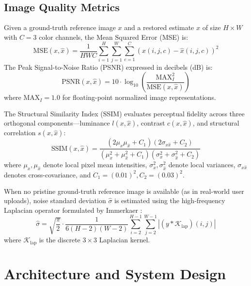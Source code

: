\documentclass{ieeeaccess}
\begin{document}
\subsection{Image Quality Metrics}
Given a ground-truth reference image $x$ and a restored estimate $\hat{x}$ of size $H \times W$ with $C=3$ color channels, the Mean Squared Error (MSE) is:
\begin{equation}
\text{MSE}(x, \hat{x}) = \frac{1}{H W C} \sum_{i=1}^H \sum_{j=1}^W \sum_{c=1}^C \left( x(i, j, c) - \hat{x}(i, j, c) \right)^2
\end{equation}
The Peak Signal-to-Noise Ratio (PSNR) expressed in decibels (dB) is:
\begin{equation}
\text{PSNR}(x, \hat{x}) = 10 \cdot \log_{10} \left( \frac{\text{MAX}_I^2}{\text{MSE}(x, \hat{x})} \right)
\end{equation}
where $\text{MAX}_I = 1.0$ for floating-point normalized image representations.

The Structural Similarity Index (SSIM) evaluates perceptual fidelity across three orthogonal components---luminance $l(x, \hat{x})$, contrast $c(x, \hat{x})$, and structural correlation $s(x, \hat{x})$:
\begin{equation}
\text{SSIM}(x, \hat{x}) = \frac{(2\mu_x \mu_{\hat{x}} + C_1)(2\sigma_{x\hat{x}} + C_2)}{(\mu_x^2 + \mu_{\hat{x}}^2 + C_1)(\sigma_x^2 + \sigma_{\hat{x}}^2 + C_2)}
\end{equation}
where $\mu_x, \mu_{\hat{x}}$ denote local pixel mean intensities, $\sigma_x^2, \sigma_{\hat{x}}^2$ denote local variances, $\sigma_{x\hat{x}}$ denotes cross-covariance, and $C_1 = (0.01)^2, C_2 = (0.03)^2$.

When no pristine ground-truth reference image is available (as in real-world user uploads), noise standard deviation $\hat{\sigma}$ is estimated using the high-frequency Laplacian operator formulated by Immerkaer \cite{immerkaer1996fast}:
\begin{equation}
\hat{\sigma} = \sqrt{\frac{\pi}{2}} \cdot \frac{1}{6 (H - 2)(W - 2)} \sum_{i=2}^{H-1} \sum_{j=2}^{W-1} |(y * \mathcal{K}_{\text{lap}})(i, j)|
\end{equation}
where $\mathcal{K}_{\text{lap}}$ is the discrete $3 \times 3$ Laplacian kernel.

\section{Architecture and System Design}
\label{sec:architecture}
\end{document}
